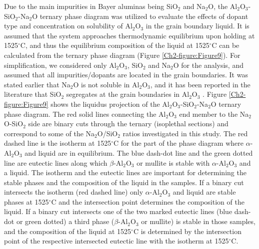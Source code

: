 Due to the main impurities in Bayer aluminas being SiO$_{2}$ and Na$_{2}$O, the Al$_{2}$O$_{3}$-SiO$_{2}$-Na$_{2}$O ternary phase diagram \cite{Lambotte2013a} was utilized to evaluate the effects of dopant type and concentration on solubility of Al$_{2}$O$_{3}$ in the grain boundary liquid. It is assumed that the system approaches thermodynamic equilibrium upon holding at 1525$^{\circ}$C, and thus the equilibrium composition of the liquid at 1525$^{\circ}$C can be calculated from the ternary phase diagram (Figure \ref{Ch2-figure:Figure9}). For simplification, we considered only Al$_{2}$O$_{3}$, SiO$_{2}$ and Na$_{2}$O for the analysis, and assumed that all impurities/dopants are located in the grain boundaries. It was stated earlier that Na$_{2}$O is not soluble in Al$_{2}$O$_{3}$, and it has been reported in the literature that SiO$_{2}$ segregates at the grain boundaries in Al$_{2}$O$_{3}$ \cite{Park2000}. Figure \ref{Ch2-figure:Figure9} shows the liquidus projection of the Al$_{2}$O$_{3}$-SiO$_{2}$-Na$_{2}$O ternary phase diagram. The red solid lines connecting the Al$_{2}$O$_{3}$ end member to the Na$_{2}$O-SiO$_{2}$ side are binary cuts through the ternary (isoplethal sections) and correspond to some of the Na$_{2}$O/SiO$_{2}$ ratios investigated in this study. The red dashed line is the isotherm at 1525$^{\circ}$C for the part of the phase diagram where $\alpha$-Al$_{2}$O$_{3}$ and liquid are in equilibrium. The blue dash-dot line and the green dotted line are eutectic lines along which $\beta$-Al$_{2}$O$_{3}$ or mullite is stable with $\alpha$-Al$_{2}$O$_{3}$ and a liquid. The isotherm and the eutectic lines are important for determining the stable phases and the composition of the liquid in the samples. If a binary cut intersects the isotherm (red dashed line) only $\alpha$-Al$_{2}$O$_{3}$ and liquid are stable phases at 1525$^{\circ}$C and the intersection point determines the composition of the liquid. If a binary cut intersects one of the two marked eutectic lines (blue dash-dot or green dotted) a third phase ($\beta$-Al$_{2}$O$_{3}$ or mullite) is stable in those samples, and the composition of the liquid at 1525$^{\circ}$C is determined by the intersection point of the respective intersected eutectic line with the isotherm at 1525$^{\circ}$C.

